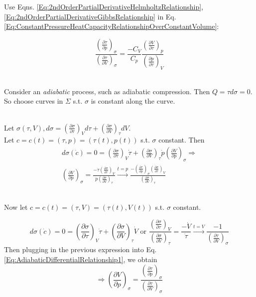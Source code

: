 \documentclass[twoside,landscape,10pt]{amsart}
\theoremstyle{plain}
\theoremstyle{definition}
\theoremstyle{remark}
\theoremstyle{remark}
\begin{document}
\begin{multicols*}{2}
Use Eqns. \ref{Eq:2ndOrderPartialDerivativeHelmholtzRelationship}, \ref{Eq:2ndOrderPartialDerivativeGibbsRelationship} in Eq. \ref{Eq:ConstantPressureHeatCapacityRelationshipOverConstantVolume}:

\begin{equation}\label{Eq:ConstantPressureHeatCapacityRelationshipOverConstantVolume2}
\frac{ \left( \frac{\partial \tau}{\partial p}\right)_{\sigma} }{ \left( \frac{\partial \tau}{\partial V}\right)_{\sigma} } = \frac{-C_V}{C_p} \frac{ \left( \frac{\partial V}{\partial \tau}\right)_p }{ \left( \frac{\partial p}{\partial \tau}\right)_V } 
\end{equation}

\quad \\ 
Consider an \emph{adiabatic} process, such as adiabatic compression. Then $Q = \tau d\sigma = 0$. So choose curves in $\Sigma$ s.t. $\sigma$ is constant along the curve.

\quad \\
Let $\sigma(\tau, V), d\sigma = \left( \frac{\partial \sigma}{\partial \tau} \right)_V d\tau + \left( \frac{\partial \sigma}{\partial V} \right)_{\tau} dV$. \\
Let $c=c(t)= (\tau, p) = (\tau(t), p(t))$ s.t. $\sigma$ constant. Then
\begin{equation}\label{Eq:AdiabaticDifferentialRelationship1}
\begin{gathered}
d\sigma(\dot{c}) = 0 = \left( \frac{\partial \sigma}{\partial \tau} \right)_V \dot{\tau} + \left( \frac{\partial \sigma}{\partial V} \right)_{\tau} \dot{p} \left( \frac{\partial V}{ \partial p } \right)_{\sigma} \Longrightarrow \\
\left( \frac{\partial V}{\partial p} \right)_{\sigma} = \frac{ - \dot{\tau} \left( \frac{\partial \sigma}{\partial \tau} \right)_V }{ \dot{p} \left( \frac{\partial \sigma}{\partial V} \right)_{\tau} }\xrightarrow{t = p} \frac{ - \left( \frac{\partial \tau}{\partial p} \right)_{\sigma} \left( \frac{\partial \sigma}{\partial \tau}\right)_V }{ \left( \frac{\partial \sigma}{\partial V}\right)_{\tau} } 
\end{gathered}
\end{equation}

\quad \\
Now let $c=c(t) = (\tau, V) = (\tau(t), V(t))$ s.t. $\sigma$ constant.

\[
d\sigma(\dot{c}) = 0 = \left( \frac{\partial \sigma}{\partial \tau} \right)_V \dot{\tau} + \left( \frac{\partial \sigma}{\partial V} \right)_{\tau} \dot{V} \text{ or } \frac{ \left( \frac{\partial \sigma}{\partial \tau}\right)_V }{ \left( \frac{\partial \sigma}{\partial V}\right)_{\tau} } = \frac{  - \dot{V}}{\dot{\tau}} \xrightarrow{ t = V} \frac{-1}{ \left( \frac{\partial \tau}{\partial V} \right)_{\sigma} }
\]
Then plugging in the previous expression into Eq. \ref{Eq:AdiabaticDifferentialRelationship1}, we obtain
\begin{equation}\label{Eq:AdiabaticCompressionOfV}
\Longrightarrow \left( \frac{\partial V}{ \partial p} \right)_{\sigma} = \frac{ \left( \frac{\partial \tau }{\partial p} \right)_{\sigma} }{ \left( \frac{\partial \tau}{\partial V} \right)_{\sigma} }
\end{equation}


\end{multicols*}
\end{document}
